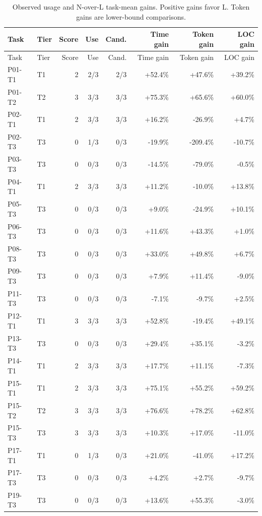 \documentclass[10pt]{article}
\renewcommand{\arraystretch}{1.13}
\begin{document}
\footnotesize
\setlength{\tabcolsep}{12pt}
\renewcommand{\arraystretch}{1.0}
\begin{longtable}{@{}llrrrrrr@{}}
\caption{Observed usage and N-over-L task-mean gains. Positive gains favor L. Token gains are lower-bound comparisons.}\label{tab:tasks}\\
\toprule
Task & Tier & Score & Use & Cand. & Time gain & Token gain & LOC gain \\
\midrule
\endfirsthead
\toprule
Task & Tier & Score & Use & Cand. & Time gain & Token gain & LOC gain \\
\midrule
\endhead
P01-T1 & T1 & 2 & 2/3 & 2/3 & +52.4\% & +47.6\% & +39.2\% \\
P01-T2 & T2 & 3 & 3/3 & 3/3 & +75.3\% & +65.6\% & +60.0\% \\
P02-T1 & T1 & 2 & 3/3 & 3/3 & +16.2\% & -26.9\% & +4.7\% \\
P02-T3 & T3 & 0 & 1/3 & 0/3 & -19.9\% & -209.4\% & -10.7\% \\
P03-T3 & T3 & 0 & 0/3 & 0/3 & -14.5\% & -79.0\% & -0.5\% \\
P04-T1 & T1 & 2 & 3/3 & 3/3 & +11.2\% & -10.0\% & +13.8\% \\
P05-T3 & T3 & 0 & 0/3 & 0/3 & +9.0\% & -24.9\% & +10.1\% \\
P06-T3 & T3 & 0 & 0/3 & 0/3 & +11.6\% & +43.3\% & +1.0\% \\
P08-T3 & T3 & 0 & 0/3 & 0/3 & +33.0\% & +49.8\% & +6.7\% \\
P09-T3 & T3 & 0 & 0/3 & 0/3 & +7.9\% & +11.4\% & -9.0\% \\
P11-T3 & T3 & 0 & 0/3 & 0/3 & -7.1\% & -9.7\% & +2.5\% \\
P12-T1 & T1 & 3 & 3/3 & 3/3 & +52.8\% & -19.4\% & +49.1\% \\
P13-T3 & T3 & 0 & 0/3 & 0/3 & +29.4\% & +35.1\% & -3.2\% \\
P14-T1 & T1 & 2 & 3/3 & 3/3 & +17.7\% & +11.1\% & -7.3\% \\
P15-T1 & T1 & 2 & 3/3 & 3/3 & +75.1\% & +55.2\% & +59.2\% \\
P15-T2 & T2 & 3 & 3/3 & 3/3 & +76.6\% & +78.2\% & +62.8\% \\
P15-T3 & T3 & 3 & 3/3 & 3/3 & +10.3\% & +17.0\% & -11.0\% \\
P17-T1 & T1 & 0 & 1/3 & 0/3 & +21.0\% & -41.0\% & +17.2\% \\
P17-T3 & T3 & 0 & 0/3 & 0/3 & +4.2\% & +2.7\% & -9.7\% \\
P19-T3 & T3 & 0 & 0/3 & 0/3 & +13.6\% & +55.3\% & -3.0\% \\

\end{longtable}
\end{document}
